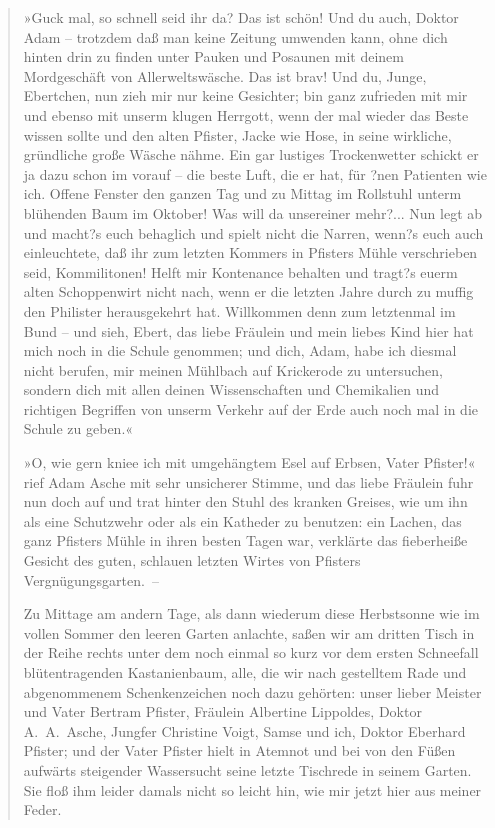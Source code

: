 \begin{verse}
»Guck mal, so schnell seid ihr da? Das ist schön! Und du auch,
Doktor Adam – trotzdem daß man keine Zeitung umwenden kann, ohne
dich hinten drin zu finden unter Pauken und Posaunen mit deinem
Mordgeschäft von Allerweltswäsche. Das ist brav! Und du, Junge,
Ebertchen, nun zieh mir nur keine Gesichter; bin ganz zufrieden mit
mir und ebenso mit unserm klugen Herrgott, wenn der mal wieder das
Beste wissen sollte und den alten Pfister, Jacke wie Hose, in seine
wirkliche, gründliche große Wäsche nähme. Ein gar lustiges
Trockenwetter schickt er ja dazu schon im vorauf – die beste Luft,
die er hat, für ?nen Patienten wie ich. Offene Fenster den ganzen
Tag und zu Mittag im Rollstuhl unterm blühenden Baum im Oktober!
Was will da unsereiner mehr?... Nun legt ab und macht?s euch
behaglich und spielt nicht die Narren, wenn?s euch auch
einleuchtete, daß ihr zum letzten Kommers in Pfisters Mühle
verschrieben seid, Kommilitonen! Helft mir Kontenance behalten und
tragt?s euerm alten Schoppenwirt nicht nach, wenn er die letzten
Jahre durch zu muffig den Philister herausgekehrt hat. Willkommen
denn zum letztenmal im Bund – und sieh, Ebert, das liebe Fräulein
und mein liebes Kind hier hat mich noch in die Schule genommen; und
dich, Adam, habe ich diesmal nicht berufen, mir meinen Mühlbach auf
Krickerode zu untersuchen, sondern dich mit allen deinen
Wissenschaften und Chemikalien und richtigen Begriffen von unserm
Verkehr auf der Erde auch noch mal in die Schule zu geben.«

»O, wie gern kniee ich mit umgehängtem Esel auf Erbsen, Vater
Pfister!« rief Adam Asche mit sehr unsicherer Stimme, und das liebe
Fräulein fuhr nun doch auf und trat hinter den Stuhl des kranken
Greises, wie um ihn als eine Schutzwehr oder als ein Katheder zu
benutzen: ein Lachen, das ganz Pfisters Mühle in ihren besten Tagen
war, verklärte das fieberheiße Gesicht des guten, schlauen letzten
Wirtes von Pfisters Vergnügungsgarten.~–

Zu Mittage am andern Tage, als dann wiederum diese Herbstsonne wie
im vollen Sommer den leeren Garten anlachte, saßen wir am dritten
Tisch in der Reihe rechts unter dem noch einmal so kurz vor dem
ersten Schneefall blütentragenden Kastanienbaum, alle, die wir nach
gestelltem Rade und abgenommenem Schenkenzeichen noch dazu
gehörten: unser lieber Meister und Vater Bertram Pfister, Fräulein
Albertine Lippoldes, Doktor A.~A.~Asche, Jungfer Christine Voigt,
Samse und ich, Doktor Eberhard Pfister; und der Vater Pfister hielt
in Atemnot und bei von den Füßen aufwärts steigender Wassersucht
seine letzte Tischrede in seinem Garten. Sie floß ihm leider damals
nicht so leicht hin, wie mir jetzt hier aus meiner Feder.


\end{verse}
